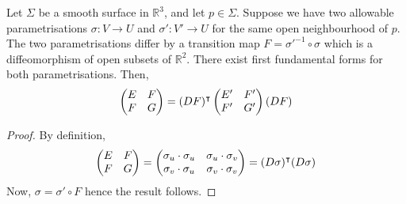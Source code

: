\begin{lemma}
	Let $\Sigma$ be a smooth surface in $\mathbb R^3$, and let $p \in \Sigma$.
	Suppose we have two allowable parametrisations $\sigma \colon V \to U$ and $\sigma' \colon V' \to U$ for the same open neighbourhood of $p$.
	The two parametrisations differ by a transition map $F = {\sigma'}^{-1} \circ \sigma$ which is a diffeomorphism of open subsets of $\mathbb R^2$.
	There exist first fundamental forms for both parametrisations.
	Then,
	\begin{align*}
		\begin{pmatrix}
			E & F \\
			F & G
		\end{pmatrix} = (DF)^\intercal \begin{pmatrix}
			E' & F' \\
			F' & G'
		\end{pmatrix} (DF)
	\end{align*}
\end{lemma}
\begin{proof}
	By definition,
	\begin{align*}
		\begin{pmatrix}
			E & F \\
			F & G
		\end{pmatrix} = \begin{pmatrix}
			\sigma_u \cdot \sigma_u & \sigma_u \cdot \sigma_v \\
			\sigma_v \cdot \sigma_u & \sigma_v \cdot \sigma_v
		\end{pmatrix} = (D\sigma)^\intercal (D\sigma)
	\end{align*}
	Now, $\sigma = \sigma' \circ F$ hence the result follows.
\end{proof}

